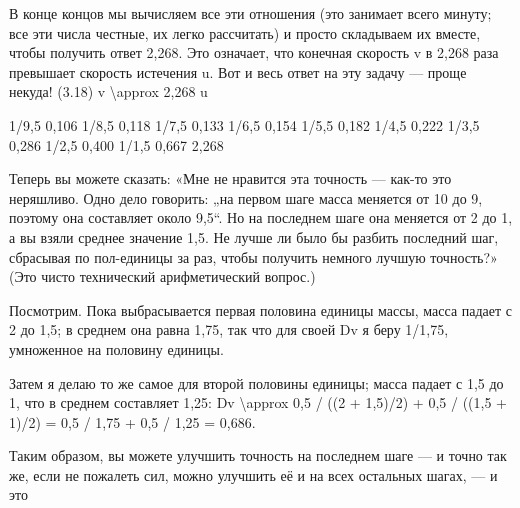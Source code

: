 \documentclass[10pt,oneside]{article}
\begin{document}
В конце концов мы вычисляем все эти отношения (это занимает всего минуту; все эти числа честные, их легко рассчитать) и просто складываем их вместе, чтобы получить ответ 2,268. Это означает, что конечная скорость v в 2,268 раза превышает скорость истечения u. Вот и весь ответ на эту задачу --- проще некуда! (3.18) v \textbackslash{}approx 2,268 u\par

1/9,5   0,106 1/8,5   0,118 1/7,5   0,133 1/6,5   0,154 1/5,5   0,182 1/4,5   0,222 1/3,5   0,286 1/2,5   0,400 1/1,5   0,667 2,268\par

Теперь вы можете сказать: «Мне не нравится эта точность --- как-то это неряшливо. Одно дело говорить: „на первом шаге масса меняется от 10 до 9, поэтому она составляет около 9,5“. Но на последнем шаге она меняется от 2 до 1, а вы взяли среднее значение 1,5. Не лучше ли было бы разбить последний шаг, сбрасывая по пол-единицы за раз, чтобы получить немного лучшую точность?» (Это чисто технический арифметический вопрос.)\par

Посмотрим. Пока выбрасывается первая половина единицы массы, масса падает с 2 до 1,5; в среднем она равна 1,75, так что для своей Dv я беру 1/1,75, умноженное на половину единицы.\par

Затем я делаю то же самое для второй половины единицы; масса падает с 1,5 до 1, что в среднем составляет 1,25: Dv \textbackslash{}approx 0,5 / ((2 + 1,5)/2) + 0,5 / ((1,5 + 1)/2) = 0,5 / 1,75 + 0,5 / 1,25 = 0,686.\par

Таким образом, вы можете улучшить точность на последнем шаге --- и точно так же, если не пожалеть сил, можно улучшить её и на всех остальных шагах, --- и это\par
\end{document}
